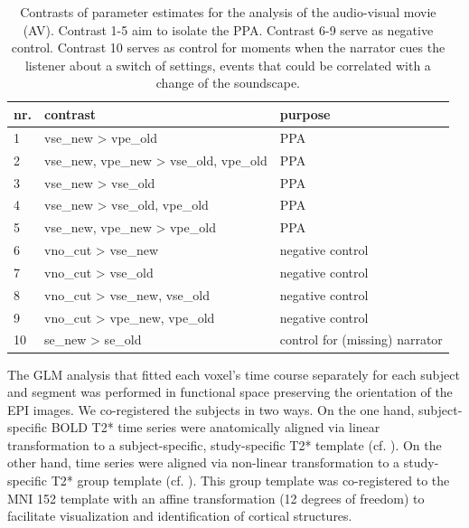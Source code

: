 \documentclass[english]{article}
\begin{document}
\begin{table}[h!]
\caption{Contrasts of parameter estimates for the analysis of the
    audio-visual movie (AV).
    Contrast 1-5 aim to isolate the PPA.
    Contrast 6-9 serve as negative control.
    Contrast 10 serves as control for moments when the narrator cues the
    listener about a switch of settings, events that could be correlated with a
    change of the soundscape.}
\label{tab:av-contrasts}
\footnotesize
\begin{tabular}{lll}
\toprule
\textbf{nr.} &  \textbf{contrast} & \textbf{purpose} \\
\midrule
1 & vse\_new > vpe\_old & PPA \tabularnewline
2 & vse\_new, vpe\_new > vse\_old, vpe\_old & PPA \tabularnewline
3 & vse\_new > vse\_old & PPA \tabularnewline
4 & vse\_new > vse\_old, vpe\_old & PPA \tabularnewline
5 & vse\_new, vpe\_new > vpe\_old & PPA \tabularnewline
6 & vno\_cut > vse\_new & negative control \tabularnewline
7 & vno\_cut > vse\_old & negative control \tabularnewline
8 & vno\_cut > vse\_new, vse\_old & negative control \tabularnewline
9 & vno\_cut > vpe\_new, vpe\_old & negative control \tabularnewline
10 & se\_new > se\_old & control for (missing) narrator \tabularnewline
\end{tabular}
\end{table}

The GLM analysis that fitted each voxel's time course separately for each
subject and segment was performed in functional space preserving the orientation
of the EPI images.
We co-registered the subjects in two ways.
On the one hand, subject-specific BOLD T2* time series were anatomically aligned
via linear transformation to a subject-specific, study-specific T2* template
(cf. \citep{sengupta2016extension}).
On the other hand, time series were aligned via non-linear transformation to a
study-specific T2* group template (cf. \citep{hanke2014audiomovie}).
This group template was co-registered to the MNI 152 template with an affine
transformation (12 degrees of freedom) to facilitate visualization and
identification of cortical structures.
\end{document}

